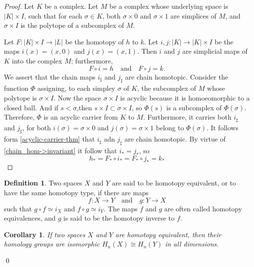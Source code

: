 \documentclass[draft,toc=bib]{scrartcl}
\theoremstyle{plain}
\newtheorem{corollary}[theorem]{Corollary}
\theoremstyle{definition}
\newtheorem	{definition}[theorem]{Definition}
\theoremstyle{remark}
\newcommand{\isom}{\cong}
\newcommand{\qandq}{\quad \text{and} \quad}
\begin{document}
\begin{proof}
	Let $K$ be a complex. Let $M$ be a complex whose underlying space is $|K|\times I$, such that for each $\sigma\in K$, both $\sigma\times 0$ and $\sigma\times 1$ are simplices of $M$, and $\sigma \times I$ is the polytope of a subcomplex of $M$.
	
	Let $F:|K|\times I\to |L|$ be the homotopy of $h$ to $k$. Let $i,j: |K|\to |K|\times I$ be the maps $i(x)=(x,0)$ and $j(x)=(x,1)$. Then $i$ and $j$ are simplicial maps of $K$ into the complex $M$; furthermore,
	\[
	F\circ i=h\qandq F\circ j=k.
	\]
	We assert that the chain maps $i_\sharp$ and $j_\sharp$ are chain homotopic. Consider the function $\Phi$ assigning, to each simpley $\sigma$ of $K$, the subcomplex of $M$ whose polytope is $\sigma \times I$. Now the space $\sigma\times I$ is acyclic because it is homoeomorphic to a closed ball. And if $s<\sigma$,then $s\times I\subset\sigma\times I$, so $\Phi(s)$ is a subcomplex of $\Phi(\sigma)$. Therefore, $\Phi$ is an acyclic carrier from $K$ to $M$. Furthermore, it carries both $i_\sharp$ and $j_\sharp$, for both $i(\sigma)=\sigma\times 0$ and $j(\sigma)=\sigma\times 1$ belong to $\Phi(\sigma)$. It follows form \autoref{acyclic-carrier-thm} that $i_\sharp$ adn $j_\sharp$ are chain homotopic. By virtue of \autoref{chain_hom->invariant} it follow that $i_\ast=j_\ast$, so 
	\[
	h_\ast=F_\ast\circ i_\ast=F_\ast\circ j_\ast=k_\ast
	\]
	\end{proof}


\begin{definition}
	Two spaces $X$ and $Y$ are said to be homotopy equivalent, or to have the same homotopy type, if there are maps\[
	f: X\to Y\qandq g:Y\to X
	\]
	such that $g\circ f\simeq i_X$ and $f\circ g\simeq i_Y$. The maps $f$ and $g$ are often called homotopy equivalences, and $g$ is said to be the homotopy inverse to $f$.
\end{definition}

\begin{corollary}
	If two spaces $X$ and $Y$ are homotopy equivalent, then their homology groups are isomorphic $H_n(X)\isom H_n(Y)$ in all dimensions.
\end{corollary}\qed



\printbibliography
\end{document}
